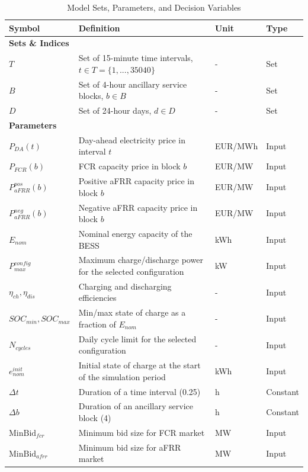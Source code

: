 
\begin{table}[h!]
\centering
\caption{Model Sets, Parameters, and Decision Variables}
\begin{tabularx}{0.8\textwidth}{|X|X|X|X|}
\hline
\textbf{Symbol} & \textbf{Definition} & \textbf{Unit} & \textbf{Type} \\
\hline
\multicolumn{4}{|l|}{\textbf{Sets \& Indices}} \\
\hline
$T$ & Set of 15-minute time intervals, $t \in T = \{1, ..., 35040\}$ & - & Set \\
\hline
$B$ & Set of 4-hour ancillary service blocks, $b \in B$ & - & Set \\
\hline
$D$ & Set of 24-hour days, $d \in D$ & - & Set \\
\hline
\multicolumn{4}{|l|}{\textbf{Parameters}} \\
\hline
$P_{DA}(t)$ & Day-ahead electricity price in interval $t$ & EUR/MWh & Input \\
\hline
$P_{FCR}(b)$ & FCR capacity price in block $b$ & EUR/MW & Input \\
\hline
$P_{aFRR}^{pos}(b)$ & Positive aFRR capacity price in block $b$ & EUR/MW & Input \\
\hline
$P_{aFRR}^{neg}(b)$ & Negative aFRR capacity price in block $b$ & EUR/MW & Input \\
\hline
$E_{nom}$ & Nominal energy capacity of the BESS & kWh & Input \\
\hline
$P_{max}^{config}$ & Maximum charge/discharge power for the selected configuration & kW & Input \\
\hline
$\eta_{ch}, \eta_{dis}$ & Charging and discharging efficiencies & - & Input \\
\hline
$SOC_{min}, SOC_{max}$ & Min/max state of charge as a fraction of $E_{nom}$ & - & Input \\
\hline
$N_{cycles}$ & Daily cycle limit for the selected configuration & - & Input \\
\hline
$e_{nom}^{init}$ & Initial state of charge at the start of the simulation period & kWh & Input \\
\hline
$\Delta t$ & Duration of a time interval (0.25) & h & Constant \\
\hline
$\Delta b$ & Duration of an ancillary service block (4) & h & Constant \\
\hline
$\text{MinBid}_{fcr}$ & Minimum bid size for FCR market & MW & Input \\
\hline
$\text{MinBid}_{afrr}$ & Minimum bid size for aFRR market & MW & Input \\

\end{tabularx}
\end{table}
